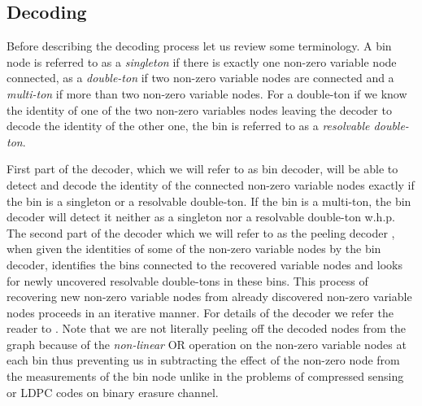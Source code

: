 \documentclass[conference,twocolumn]{IEEEtran}
\begin{document}
\subsection*{Decoding}
Before describing the decoding process let us review some terminology. A bin node is referred to as a \textit{singleton} if there is exactly one non-zero variable node connected, as a \textit{double-ton} if two non-zero variable nodes are connected and a \textit{multi-ton} if more than two non-zero variable nodes. For a double-ton if we know the identity of one of the two non-zero variables nodes leaving the decoder to decode the identity of the other one, the bin is referred to as a \textit{resolvable double-ton}.

First part of the decoder, which we will refer to as bin decoder, will be able to detect and decode the identity of the connected non-zero variable nodes exactly if the bin is a singleton or a resolvable double-ton. If the bin is a multi-ton, the bin decoder will detect it neither as a singleton nor a resolvable double-ton w.h.p. The second part of the decoder which we will refer to as the peeling decoder \cite{li2015subisit}, when given the identities of some of the non-zero variable nodes by the bin decoder, identifies the bins connected to the recovered variable nodes and looks for newly uncovered resolvable double-tons in these bins. This process of recovering new non-zero variable nodes from already discovered non-zero variable nodes proceeds in an iterative manner. For details of the decoder we refer the reader to \cite{lee2015saffron}. Note that we are not literally peeling off the decoded nodes from the graph because of the \textit{non-linear} OR operation on the non-zero variable nodes at each bin thus preventing us in subtracting the effect of the non-zero node from the measurements of the bin node unlike in the problems of compressed sensing or LDPC codes on binary erasure channel.
\end{document}
